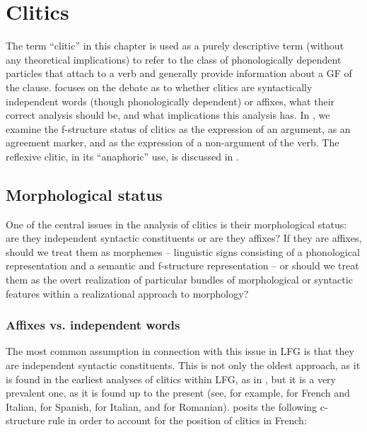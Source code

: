 \documentclass[output=paper,hidelinks]{langscibook}
\begin{document}
\section{Clitics}
\label{sec:Romance:2}

The term ``clitic'' in this chapter is used as a purely descriptive term (without any theoretical implications) to refer to the class of phonologically dependent particles that attach to a verb and generally provide information about a GF of the clause.  focuses on the debate as to whether clitics are syntactically independent words (though phonologically dependent) or affixes, what their correct analysis should be, and what implications this analysis has. In , we examine the f-structure status of clitics as the expression of an argument, as an agreement marker, and as the expression of a non-argument of the verb. The reflexive clitic, in its ``anaphoric'' use, is discussed in .

\subsection{Morphological status}
\label{sec:Romance:2.1}

One of the central issues in the analysis of clitics is their morphological status: are they independent syntactic constituents or are they affixes? If they are affixes, should we treat them as morphemes  -- linguistic signs consisting of a phonological representation and a semantic and f-structure representation --  or should we treat them as the overt realization of particular bundles of morphological or syntactic features within a realizational approach to morphology?

\subsubsection{Affixes vs. independent words}
\label{sec:Romance:2.1.1}

The most common assumption in connection with this issue in LFG is that they are independent syntactic constituents. This is not only the oldest approach, as it is found in the earliest analyses of clitics within LFG, as in \citet{Grimshaw1982}, but it is a very prevalent one, as it is found up to the present (see, for example, \citet{Schwarze2001} for French and Italian, \citet{Estigarribia2005,Estigarribia2013} for Spanish, \citealt{Quaglia2012} for Italian, and \citealt{BarbuToivonen2018} for Romanian). \citet[90]{Grimshaw1982} posits the following c-structure rule in order to account for the position of clitics in French:
\end{document}
